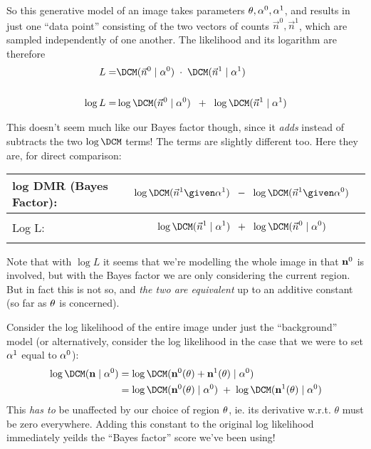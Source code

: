 \documentclass[12pt]{article}
\begin{document}
So this generative model of an image takes parameters $\theta,
\mathbf{\alpha}^0, \mathbf{\alpha}^1$, and results in just one ``data point''
consisting of the two vectors of counts $\vec{n}^0,\vec{n}^1$, which are sampled independently of one another.  The
likelihood and its logarithm are therefore
\begin{align*}
L =& \DCM(\vec{n}^0 \mid \balpha^0) \; \cdot \; \DCM(\vec{n}^1 \mid \balpha^1) 
\\ \\
\log L =& \log \DCM(\vec{n}^0 \mid \balpha^0) \;\; + \;\; \log \DCM(\vec{n}^1 \mid \balpha^1) 
\end{align*}

This doesn't seem much like our Bayes factor though, since it
\emph{adds} instead of subtracts the two $\log \DCM$ terms! The terms
are slightly different too.  Here they are, for direct comparison:

\begin{tabular}{|l|l|}
\hline
log DMR (Bayes Factor): & 
\parbox{.7\textwidth}{
\begin{align*}
&\log \DCM(\vec{n}^1 \given \balpha^1) \;\;-\;\; \log \DCM(\vec{n}^1 \given \balpha^0)
\end{align*}
} \\
\hline
Log L: & 
\parbox{.7\textwidth}{
\begin{align*}
& \log \DCM(\vec{n}^1 \mid \balpha^1) \;\; + \;\; \log \DCM(\vec{n}^0 \mid \balpha^0)
\end{align*}
} \\
\hline
\end{tabular}

Note that with $\log L$ it seems that we're modelling the whole image
in that $\mathbf{n}^0$ is involved, but with the Bayes factor we are only
considering the current region. But in fact this is not so, and {\it
  the two are equivalent} up to an additive constant (so far as
$\mathbf{\theta}$ is concerned).

Consider the log likelihood of the entire image under just the
``background'' model (or alternatively, consider the log likelihood in the case that we were to set $\mathbf{\alpha}^1$ equal to $\mathbf{\alpha}^0$):
\begin{align*}
\log \DCM(\bn \mid \balpha^0) 
&= \log \DCM(\bn^0(\theta) + \bn^1(\theta) \mid \balpha^0)  \\
&= \log \DCM(\bn^0(\theta) \mid \balpha^0) \; + \; \log \DCM(\bn^1(\theta) \mid \balpha^0) 
\end{align*}
This \emph{has to} be unaffected by our choice of region $\mathbf{\theta}$,
ie. its derivative w.r.t. $\theta$ must be zero everywhere.  Adding
this constant to the original log likelihood immediately yeilds the
``Bayes factor'' score we've been using!
\end{document}

